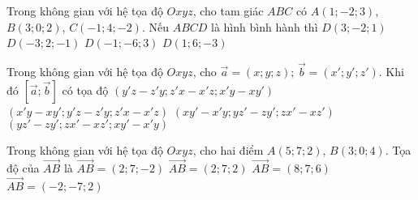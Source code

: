 \begin{ex}%
Trong không gian với hệ tọa độ $Oxyz$, cho tam giác $ABC$ có $A(1;-2;3)$, $B(3;0;2)$, $C(-1;4;-2)$. Nếu $ABCD$ là hình bình hành thì
\choice
{$D(3;-2;1)$}
{\True $D(-3;2;-1)$}
{$D(-1;-6;3)$}
{$D(1;6;-3)$}
\end{ex}

\begin{ex}%
Trong không gian với hệ tọa độ $Oxyz$, cho $\overrightarrow{a}=(x;y;z)$; $\overrightarrow{b}=(x';y';z')$. Khi đó $\left[\overrightarrow{a};\overrightarrow{b}\right]$ có tọa độ
\choice
{$(y'z-z'y; z'x-x'z; x'y-xy')$}
{$(x'y-xy'; y'z-z'y; z'x-x'z)$}
{$(xy'-x'y;yz'-zy';zx'-xz')$}
{\True $(yz'-zy';zx'-xz';xy'-x'y)$}
\loigiai{

}

\end{ex}
\begin{ex}%
Trong không gian với hệ tọa độ $Oxyz$, cho hai điểm $A(5;7;2)$, $B(3;0;4)$. Tọa độ của $\overrightarrow{AB}$ là
\choice
{$\overrightarrow{AB}=(2;7;-2)$}
{$\overrightarrow{AB}=(2;7;2)$}
{$\overrightarrow{AB}=(8;7;6)$}
{\True $\overrightarrow{AB}=(-2;-7;2)$}
\end{ex}


